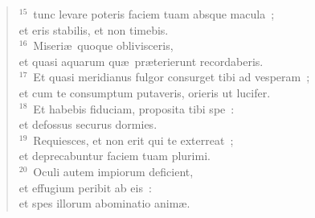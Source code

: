 \begin{flushleft}
\begin{verse}
${}^{15}$~tunc levare poteris faciem tuam absque macula~;\\ et eris stabilis, et non timebis.\\
${}^{16}$~Miseri\ae\ quoque oblivisceris,\\ et quasi aquarum qu\ae\ pr\ae terierunt recordaberis.\\
${}^{17}$~Et quasi meridianus fulgor consurget tibi ad vesperam~;\\ et cum te consumptum putaveris, orieris ut lucifer.\\
${}^{18}$~Et habebis fiduciam, proposita tibi spe~:\\ et defossus securus dormies.\\
${}^{19}$~Requiesces, et non erit qui te exterreat~;\\ et deprecabuntur faciem tuam plurimi.\\
${}^{20}$~Oculi autem impiorum deficient,\\ et effugium peribit ab eis~:\\ et spes illorum abominatio anim\ae .\end{verse}\end{flushleft}



